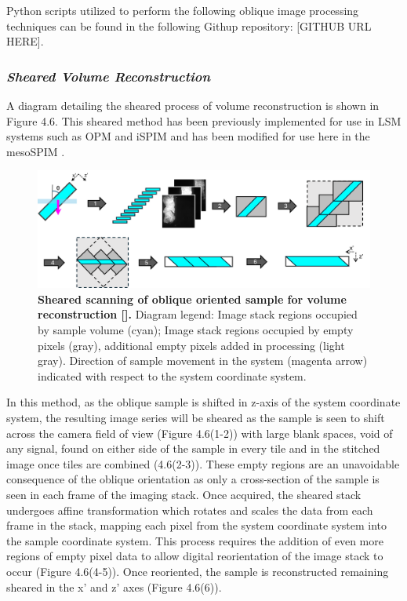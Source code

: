 Python scripts utilized to perform the following oblique image processing techniques can be found in the following Githup repository: [GITHUB URL HERE].

 
\subsubsection{\textit{Sheared Volume Reconstruction}}

A diagram detailing the sheared process of volume reconstruction is shown in Figure 4.6. This sheared method has been previously implemented for use in LSM systems such as OPM and iSPIM and has been modified for use here in the mesoSPIM \cite{wu_inverted_2011, dunsby_optically_2008}. 

\begin{figure}[H]
    \centering
    \includegraphics[width=1\linewidth]{Figures/shear.png}
    \medskip
    \caption{\textbf{Sheared scanning of oblique oriented sample for volume reconstruction [].} Diagram legend: Image stack regions occupied by sample volume (cyan); Image stack regions occupied by empty pixels (gray), additional empty pixels added in processing (light gray). Direction of sample movement in the system (magenta arrow) indicated with respect to the system coordinate system.}
    \label{fig:enter-label}
\end{figure}

In this method, as the oblique sample is shifted in z-axis of the system coordinate system, the resulting image series will be sheared as the sample is seen to shift across the camera field of view (Figure 4.6(1-2)) with large blank spaces, void of any signal, found on either side of the sample in every tile and in the stitched image once tiles are combined (4.6(2-3)). These empty regions are an unavoidable consequence of the oblique orientation as only a cross-section of the sample is seen in each frame of the imaging stack. Once acquired, the sheared stack undergoes affine transformation which rotates and scales the data from each frame in the stack, mapping each pixel from the system coordinate system into the sample coordinate system. This process requires the addition of even more regions of empty pixel data to allow digital reorientation of the image stack to occur (Figure 4.6(4-5)). Once reoriented, the sample is reconstructed remaining sheared in the x' and z' axes (Figure 4.6(6)).


